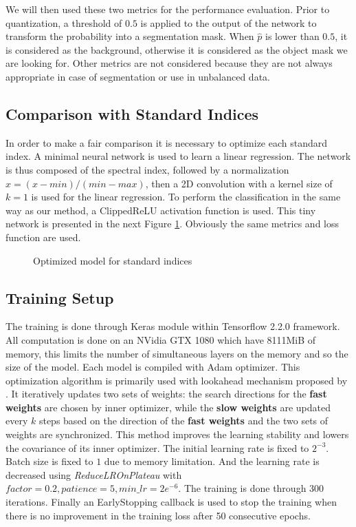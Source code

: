 \documentclass[../thesis.tex]{subfiles}
\begin{document}
	We will then used these two metrics for the performance evaluation. Prior to quantization, a threshold of $0.5$ is applied to the output of the network to transform the probability into a segmentation mask. When $\hat{p}$ is lower than $0.5$, it is considered as the background, otherwise it is considered as the object mask we are looking for. Other metrics are not considered because they are not always appropriate in case of segmentation or use in unbalanced data.
	
	\subsection{Comparison with Standard Indices}
	In order to make a fair comparison it is necessary to optimize each standard index. A minimal neural network is used to learn a linear regression. The network is thus composed of the spectral index, followed by a normalization $x=(x-min)/(min-max)$, then a 2D convolution with a kernel size of $k=1$ is used for the linear regression. To perform the classification in the same way as our method, a ClippedReLU activation function is used. This tiny network is presented in the next Figure \ref{fig:index-conv}. Obviously the same metrics and loss function are used.
	
	\begin{figure}[H]
		\centering
		
		\caption{ {Optimized} model for standard indices}
		\label{fig:index-conv}
	\end{figure}
	
	\subsection{Training Setup}
	
	The training is done through Keras module within Tensorflow 2.2.0 framework. All computation is done on an NVidia GTX 1080 which have 8111MiB of memory, this limits the number of simultaneous layers on the memory and so the size of the model. Each model is compiled with Adam optimizer. This optimization algorithm is primarily used with lookahead mechanism proposed by \cite{Adam2019}. It iteratively updates two sets of weights: the search directions for the \textbf{ {fast} weights} are chosen by inner optimizer, while the \textbf{ {slow} weights} are updated every $k$ steps based on the direction of the \textbf{ {fast} weights} and the two sets of weights are synchronized. This method improves the learning stability and lowers the covariance of its inner optimizer. The initial learning rate is fixed to $2^{-3}$. Batch size is fixed to $1$ due to memory limitation. And the learning rate is decreased using \textit{ReduceLROnPlateau} with $factor=0.2, patience=5, min\_lr=2e^{-6}$. The training is done through 300 iterations. Finally an EarlyStopping callback is used to stop the training when there is no improvement in the training loss after 50 consecutive epochs.%
	
\end{document}
